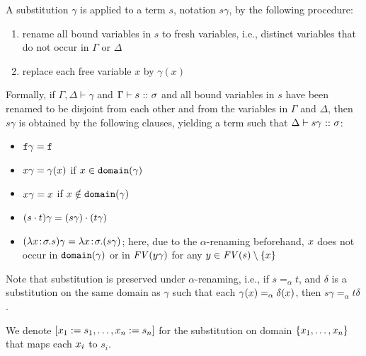A substitution $\gamma$ is applied to a term $s$, notation $s\gamma$, by the following procedure:
\begin{enumerate}
\item rename all bound variables in $s$ to fresh variables, i.e., distinct variables that do not
  occur in $\Gamma$ or $\Delta$
\item replace each free variable $x$ by $\gamma(x)$
\end{enumerate}

Formally, if $\Gamma,\Delta \vdash \gamma$ and $\Gamma \vdash s \ \mathtt{::}\  \sigma$ and all bound
variables in $s$ have been renamed to be disjoint from each other and from the variables in
$\Gamma$ and $\Delta$, then $s\gamma$ is obtained by the following clauses, yielding a term such
that $\Delta \vdash s\gamma \ \mathtt{::}\  \sigma$:

\begin{itemize}
\item $\mathtt{f}\gamma = \mathtt{f}$
\item $x\gamma = \gamma(x)$ if $x \in \mathtt{domain}(\gamma)$
\item $x\gamma = x$ if $x \notin \mathtt{domain}(\gamma)$
\item $(s \cdot t)\gamma = (s\gamma) \cdot (t\gamma)$
\item $(\lambda x\!:\!\sigma.s)\gamma = \lambda x\!:\!\sigma.(s\gamma)$;
  here, due to the $\alpha$-renaming beforehand, $x$ does not occur in $\mathtt{domain}(\gamma)$ or in
  $\mathit{FV}(y\gamma)$ for any $y \in \mathit{FV}(s) \setminus \{x\}$
\end{itemize}

Note that substitution is preserved under $\alpha$-renaming, i.e., if $s =_\alpha t$, and $\delta$
is a substitution on the same domain as $\gamma$ such that each $\gamma(x) =_\alpha
\delta(x)$, then $s\gamma =_\alpha t\delta$.

We denote $[x_1:=s_1,\dots,x_n:=s_n]$ for the substitution on domain $\{x_1,\dots,
x_n\}$ that maps each $x_i$ to $s_i$.

